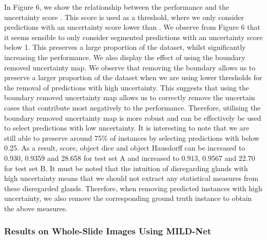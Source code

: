 \documentclass[3p]{elsarticle}
\begin{document}
In Figure 6, we show the relationship between the performance and the uncertainty score . This score is used as a threshold, where we only consider predictions  with an uncertainty score  lower than . We observe from Figure 6 that it seems sensible to only consider segmented predictions with an uncertainty score  below 1. This preserves a large proportion of the dataset, whilst significantly increasing the performance. We also display the effect of using the boundary removed uncertainty map. We observe that removing the boundary allows us to preserve a larger proportion of the dataset when we are using lower thresholds for the removal of predictions with high uncertainty. This suggests that using the boundary removed uncertainty map allows us to correctly remove the uncertain cases that contribute most negatively to the performance. Therefore, utilising the boundary removed uncertainty map is more robust and can be effectively be used to select predictions with low uncertainty. It is interesting to note that we are still able to preserve around 75\% of instances by selecting predictions with  below 0.25. As a result,  score, object dice and object Hausdorff can be increased to 0.930, 0.9359 and 28.658 for test set A and increased to 0.913, 0.9567 and 22.70 for test set B. It must be noted that the intuition of disregarding glands with high uncertainty means that we should not extract any statistical measures from these disregarded glands. Therefore, when removing predicted instances with high uncertainty, we also remove the corresponding ground truth instance to obtain the above measures. 

\subsubsection{Results on Whole-Slide Images Using MILD-Net}
\end{document}
